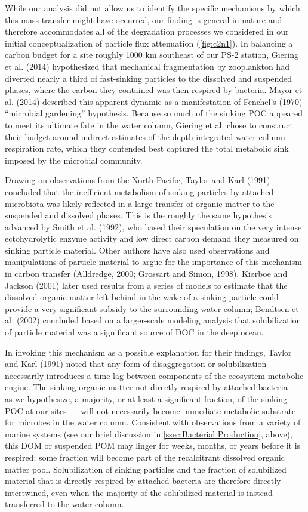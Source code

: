While our analysis did not allow us to identify the specific mechanisms by which this mass transfer might have occurred, our finding is general in nature and therefore accommodates all of the degradation processes we considered in our initial conceptualization of particle flux attenuation (\autoref{fig:c2n1}). In balancing a carbon budget for a site roughly 1000 km southeast of our PS-2 station, Giering et al. (2014) hypothesized that mechanical fragmentation by zooplankton had diverted nearly a third of fast-sinking particles to the dissolved and suspended phases, where the carbon they contained was then respired by bacteria. Mayor et al. (2014) described this apparent dynamic as a manifestation of Fenchel's (1970) ``microbial gardening'' hypothesis. Because so much of the sinking POC appeared to meet its ultimate fate in the water column, Giering et al. chose to construct their budget around indirect estimates of the depth-integrated water column respiration rate, which they contended best captured the total metabolic sink imposed by the microbial community.

Drawing on observations from the North Pacific, Taylor and Karl (1991) concluded that the inefficient metabolism of sinking particles by attached microbiota was likely reflected in a large transfer of organic matter to the suspended and dissolved phases. This is the roughly the same hypothesis advanced by Smith et al. (1992), who based their speculation on the very intense ectohydrolytic enzyme activity and low direct carbon demand they measured on sinking particle material. Other authors have also used observations and manipulations of particle material to argue for the importance of this mechanism in carbon transfer (Alldredge, 2000; Grossart and Simon, 1998). Ki\o{}rboe and Jackson (2001) later used results from a series of models to estimate that the dissolved organic matter left behind in the wake of a sinking particle could provide a very significant subsidy to the surrounding water column; Bendtsen et al\emph{.} (2002) concluded based on a larger-scale modeling analysis that solubilization of particle material was a significant source of DOC in the deep ocean.

In invoking this mechanism as a possible explanation for their findings, Taylor and Karl (1991) noted that any form of disaggregation or solubilization necessarily introduces a time lag between components of the ecosystem metabolic engine. The sinking organic matter not directly respired by attached bacteria --- as we hypothesize, a majority, or at least a significant fraction, of the sinking POC at our sites --- will not necessarily become immediate metabolic substrate for microbes in the water column. Consistent with observations from a variety of marine systems (see our brief discussion in \autoref{ssec:Bacterial Production}, above), this DOM or suspended POM may linger for weeks, months, or years before it is respired; some fraction will become part of the recalcitrant dissolved organic matter pool. Solubilization of sinking particles and the fraction of solubilized material that is directly respired by attached bacteria are therefore directly intertwined, even when the majority of the solubilized material is instead transferred to the water column.

